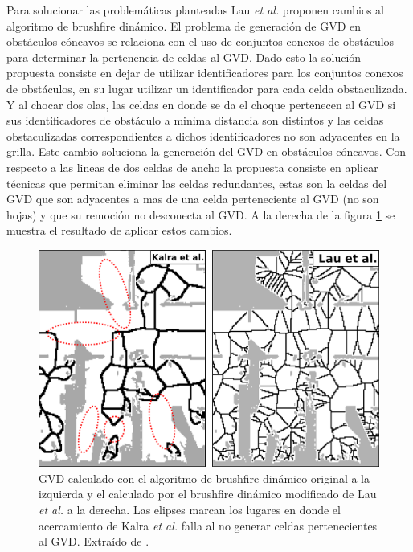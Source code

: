 Para solucionar las problemáticas planteadas Lau \textit{et al.} proponen cambios al algoritmo de brushfire dinámico. El problema de generación de GVD en obstáculos cóncavos se relaciona con el uso de conjuntos conexos de obstáculos para determinar la pertenencia de celdas al GVD. Dado esto la solución propuesta consiste en dejar de utilizar identificadores para los conjuntos conexos de obstáculos, en su lugar utilizar un identificador para cada celda obstaculizada. Y al chocar dos olas, las celdas en donde se da el choque pertenecen al GVD si sus identificadores de obstáculo a minima distancia son distintos y las celdas obstaculizadas correspondientes a dichos identificadores no son adyacentes en la grilla. Este cambio soluciona la generación del GVD en obstáculos cóncavos. Con respecto a las lineas de dos celdas de ancho la propuesta consiste en aplicar técnicas que permitan eliminar las celdas redundantes, estas son la celdas del GVD que son adyacentes a mas de una celda perteneciente al GVD (no son hojas) y que su remoción no desconecta al GVD. A la derecha de la figura \ref{fig:lauPalo} se muestra el resultado de aplicar estos cambios.
\begin{figure}[H]
  \center
  \includegraphics[width=0.75\linewidth]{imagenes/lauPalo.png}
  \caption{GVD calculado con el algoritmo de brushfire dinámico original a la izquierda y el calculado por el brushfire dinámico modificado de Lau \textit{et al.} a la derecha. Las elipses marcan los lugares en donde el acercamiento de Kalra \textit{et al.} falla al no generar celdas pertenecientes al GVD. Extraído de \cite{Lau2013}.}\label{fig:lauPalo}
\end{figure} 




